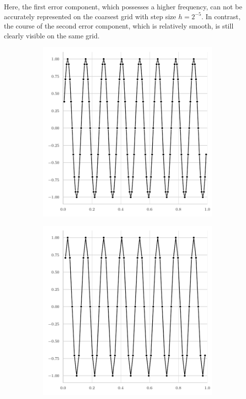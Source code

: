 Here, the first error component, which possesses a higher frequency, can not be accurately represented on the coarsest grid with step size $h = 2^{-5}$.
In contrast, the course of the second error component, which is relatively smooth, is still clearly visible on the same grid. 
\begin{figure}
	\begin{subfigure}[b]{0.32\textwidth}
		\centering
		\includegraphics[width=\textwidth]{figures/error_plots//initial_error_16pi_level7.pdf}
	\end{subfigure}
	\hfill
	\begin{subfigure}[b]{0.32\textwidth}
		\centering
		\includegraphics[width=\textwidth]{figures/error_plots//initial_error_16pi_level6.pdf}

\end{subfigure}
\end{figure}
